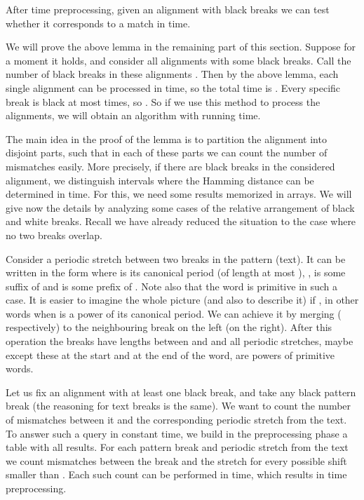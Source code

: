 \documentclass[runningheads]{llncs}
\begin{document}
\begin{lemma}\label{lemma:fast_alignments}
After  time preprocessing, given an alignment with  black breaks we can test whether it corresponds to a match in  time.
\end{lemma}
We will prove the above lemma in the remaining part of this section. Suppose for a moment it holds, and consider all alignments with some black breaks. Call the number of black breaks in these alignments . Then by the above lemma, each single alignment can be processed in  time, so the total time is . Every specific break is black at most  times, so . So if we use this method to process the alignments, we will obtain an algorithm with  running time.

The main idea in the proof of the lemma is to partition the alignment into disjoint parts, such that in each of these parts we can count the number of mismatches easily. More precisely, if there are  black breaks in the considered alignment, we distinguish  intervals where the Hamming distance can be determined in  time. For this, we need some results memorized in arrays. We will give now the details by analyzing some cases of the relative arrangement of black and white breaks. Recall we have already reduced the situation to the case where no two breaks overlap.

Consider a periodic stretch  between two breaks in the pattern (text). It can be written in the form  where  is its canonical period (of length at most ), ,  is some suffix of  and  is some prefix of . Note also that the word  is primitive in such a case. It is easier to imagine the whole picture (and also to describe it) if , in other words when  is a power of its canonical period. We can achieve it by merging  ( respectively) to the neighbouring break on the left (on the right). After this operation the breaks have lengths between  and  and all periodic stretches, maybe except these at the start and at the end of the word, are powers of primitive words.

Let us fix an alignment with at least one black break, and take any black pattern break (the reasoning for text breaks is the same). We want to count the number of mismatches between it and the corresponding periodic stretch from the text. To answer such a query in constant time, we build in the preprocessing phase a table with all results. For each pattern break and periodic stretch  from the text we count mismatches between the break and the stretch for every possible shift smaller than . Each such count can be performed in  time, which results in  time preprocessing.
\end{document}
